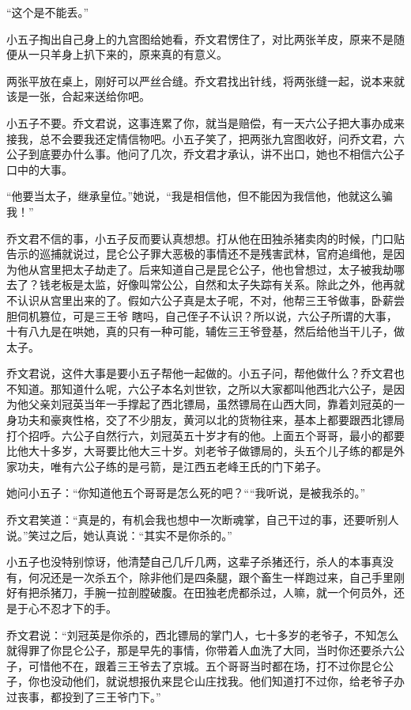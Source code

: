 “这个是不能丢。”

小五子掏出自己身上的九宫图给她看，乔文君愣住了，对比两张羊皮，原来不是随便从一只羊身上扒下来的，原来真的有意义。

两张平放在桌上，刚好可以严丝合缝。乔文君找出针线，将两张缝一起，说本来就该是一张，合起来送给你吧。

小五子不要。乔文君说，这事连累了你，就当是赔偿，有一天六公子把大事办成来接我，总不会要我还定情信物吧。小五子笑了，把两张九宫图收好，问乔文君，六公子到底要办什么事。他问了几次，乔文君才承认，讲不出口，她也不相信六公子口中的大事。

“他要当太子，继承皇位。”她说，“我是相信他，但不能因为我信他，他就这么骗我！”

乔文君不信的事，小五子反而要认真想想。打从他在田独杀猪卖肉的时候，门口贴告示的巡捕就说过，昆仑公子罪大恶极的事情还不是残害武林，官府追缉他，是因为他从宫里把太子劫走了。后来知道自己是昆仑公子，他也曾想过，太子被我劫哪去了？钱老板是太监，好像叫常公公，自然和太子失踪有关系。除此之外，他再就不认识从宫里出来的了。假如六公子真是太子呢，不对，他帮三王爷做事，卧薪尝胆伺机篡位，可是三王爷
瞎吗，自己侄子不认识？所以说，六公子所谓的大事，十有八九是在哄她，真的只有一种可能，辅佐三王爷登基，然后给他当干儿子，做太子。

乔文君说，这件大事是要小五子帮他一起做的。小五子问，帮他做什么？乔文君也不知道。那知道什么呢，六公子本名刘世钦，之所以大家都叫他西北六公子，是因为他父亲刘冠英当年一手撑起了西北镖局，虽然镖局在山西大同，靠着刘冠英的一身功夫和豪爽性格，交了不少朋友，黄河以北的货物往来，基本上都要跟西北镖局打个招呼。六公子自然行六，刘冠英五十岁才有的他。上面五个哥哥，最小的都要比他大十多岁，大哥要比他大三十岁。刘老爷子做镖局的，头五个儿子练的都是外家功夫，唯有六公子练的是弓箭，是江西五老峰王氏的门下弟子。

她问小五子：“你知道他五个哥哥是怎么死的吧？““我听说，是被我杀的。”

乔文君笑道：“真是的，有机会我也想中一次断魂掌，自己干过的事，还要听别人说。”笑过之后，她认真说：“其实不是你杀的。”

小五子也没特别惊讶，他清楚自己几斤几两，这辈子杀猪还行，杀人的本事真没有，何况还是一次杀五个，除非他们是四条腿，跟个畜生一样跑过来，自己手里刚好有把杀猪刀，手腕一拉剖膛破腹。在田独老虎都杀过，人嘛，就一个何员外，还是于心不忍才下的手。

乔文君说：“刘冠英是你杀的，西北镖局的掌门人，七十多岁的老爷子，不知怎么就得罪了你昆仑公子，那是早先的事情，你带着人血洗了大同，当时你还要杀六公子，可惜他不在，跟着三王爷去了京城。五个哥哥当时都在场，打不过你昆仑公子，你也没动他们，就说想报仇来昆仑山庄找我。他们知道打不过你，给老爷子办过丧事，都投到了三王爷门下。”

